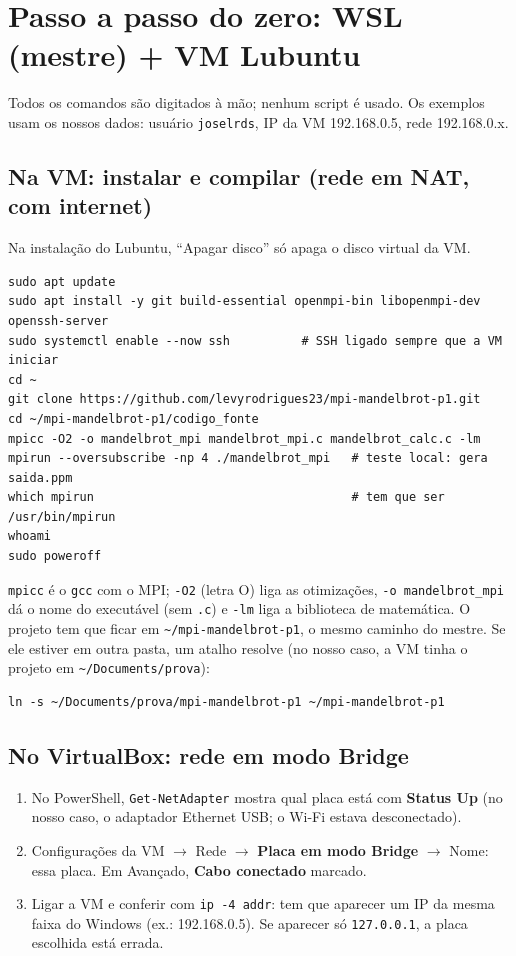 \documentclass[a4paper,11pt]{article}
\begin{document}
\section{Passo a passo do zero: WSL (mestre) + VM Lubuntu}
\label{sec:passos}

Todos os comandos são digitados à mão; nenhum script é usado. Os exemplos usam os nossos dados: usuário \texttt{joselrds}, IP da VM 192.168.0.5, rede 192.168.0.x.

\subsection{Na VM: instalar e compilar (rede em NAT, com internet)}

Na instalação do Lubuntu, ``Apagar disco'' só apaga o disco virtual da VM.

\begin{lstlisting}[style=sh]
sudo apt update
sudo apt install -y git build-essential openmpi-bin libopenmpi-dev openssh-server
sudo systemctl enable --now ssh          # SSH ligado sempre que a VM iniciar
cd ~
git clone https://github.com/levyrodrigues23/mpi-mandelbrot-p1.git
cd ~/mpi-mandelbrot-p1/codigo_fonte
mpicc -O2 -o mandelbrot_mpi mandelbrot_mpi.c mandelbrot_calc.c -lm
mpirun --oversubscribe -np 4 ./mandelbrot_mpi   # teste local: gera saida.ppm
which mpirun                                    # tem que ser /usr/bin/mpirun
whoami
sudo poweroff
\end{lstlisting}

\texttt{mpicc} é o \texttt{gcc} com o MPI; \texttt{-O2} (letra O) liga as otimizações, \texttt{-o mandelbrot\_mpi} dá o nome do executável (sem \texttt{.c}) e \texttt{-lm} liga a biblioteca de matemática. O projeto tem que ficar em \texttt{\textasciitilde/mpi-mandelbrot-p1}, o mesmo caminho do mestre. Se ele estiver em outra pasta, um atalho resolve (no nosso caso, a VM tinha o projeto em \texttt{\textasciitilde/Documents/prova}):

\begin{lstlisting}[style=sh]
ln -s ~/Documents/prova/mpi-mandelbrot-p1 ~/mpi-mandelbrot-p1
\end{lstlisting}

\subsection{No VirtualBox: rede em modo Bridge}

\begin{enumerate}[leftmargin=*]
  \item No PowerShell, \texttt{Get-NetAdapter} mostra qual placa está com \textbf{Status Up} (no nosso caso, o adaptador Ethernet USB; o Wi-Fi estava desconectado).
  \item Configurações da VM $\rightarrow$ Rede $\rightarrow$ \textbf{Placa em modo Bridge} $\rightarrow$ Nome: essa placa. Em Avançado, \textbf{Cabo conectado} marcado.
  \item Ligar a VM e conferir com \texttt{ip -4 addr}: tem que aparecer um IP da mesma faixa do Windows (ex.: 192.168.0.5). Se aparecer só \texttt{127.0.0.1}, a placa escolhida está errada.
\end{enumerate}
\end{document}
